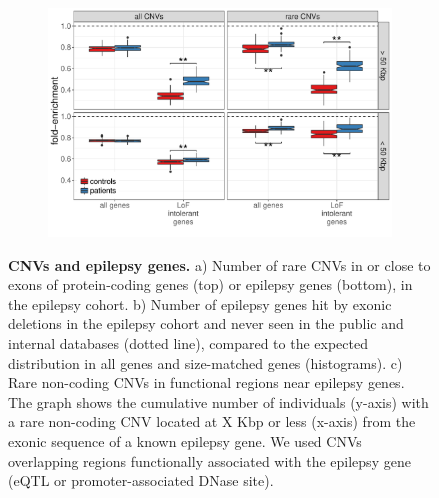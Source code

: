 \begin{figure}[!h]
  \begin{subfigure}[b]{.9\textwidth}
    \includegraphics[width=\linewidth, page=8]{figures/epilepsy-enrichmentPatterns.pdf}
    \caption{}
    \label{fig:epidistncfun}
  \end{subfigure}
  \caption[CNVs and epilepsy genes.]{{\bf CNVs and epilepsy genes.} {\small a) Number of rare CNVs in or close to exons of protein-coding genes (top) or epilepsy genes (bottom), in the epilepsy cohort. b) Number of epilepsy genes hit by exonic deletions in the epilepsy cohort and never seen in the public and internal databases (dotted line), compared to the expected distribution in all genes and size-matched genes (histograms). c) Rare non-coding CNVs in functional regions near epilepsy genes. The graph shows the cumulative number of individuals (y-axis) with a rare non-coding CNV located at X Kbp or less (x-axis) from the exonic sequence of a known epilepsy gene. We used CNVs overlapping regions functionally associated with the epilepsy gene (eQTL or promoter-associated DNase site).}}
\end{figure}


